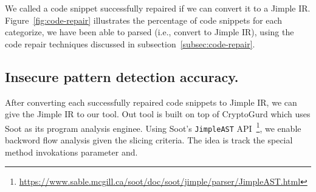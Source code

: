 We called a code snippet successfully repaired if we can convert it to a Jimple IR. Figure~\ref{fig:code-repair} illustrates the percentage of code snippets for each categorize, we have been able to parsed (i.e., convert to Jimple IR), using the code repair techniques discussed in subsection~\ref{subsec:code-repair}.  
\subsection{Insecure pattern detection accuracy.}
After converting each successfully repaired code snippets to Jimple IR, we can give the Jimple IR to our tool. Out tool is built on top of CryptoGurd which uses Soot as its program analysis enginee. Using Soot's \texttt{JimpleAST} API~\footnote{\url{https://www.sable.mcgill.ca/soot/doc/soot/jimple/parser/JimpleAST.html}}, we enable backword flow analysis given the slicing criteria. The idea is track the special method invokations parameter and.
